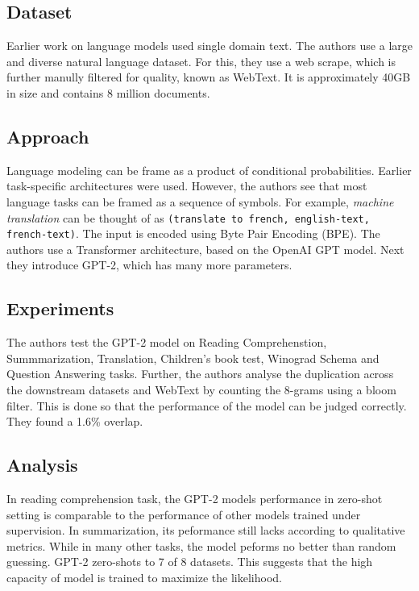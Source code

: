 \documentclass[12pt]{article}
\begin{document}
\subsection*{Dataset}

Earlier work on language models used single domain text. The authors use a large and diverse natural language dataset. For this, they use a web scrape, which is further manully filtered for quality, known as WebText. It is approximately 40GB in size and contains 8 million documents.

\subsection*{Approach}

Language modeling can be frame as a product of conditional probabilities. Earlier task-specific architectures were used. However, the authors see that most language tasks can be framed as a sequence of symbols. For example, \textit{machine translation} can be thought of as \texttt{(translate to french, english-text, french-text)}. The input is encoded using Byte Pair Encoding (BPE). The authors use a Transformer architecture, based on the OpenAI GPT model. Next they introduce GPT-2, which has many more parameters.

\subsection*{Experiments}

The authors test the GPT-2 model on Reading Comprehenstion, Summmarization, Translation, Children's book test, Winograd Schema and Question Answering tasks. Further, the authors analyse the duplication across the downstream datasets and WebText by counting the 8-grams using a bloom filter. This is done so that the performance of the model can be judged correctly. They found a 1.6\% overlap.

\subsection*{Analysis}

In reading comprehension task, the GPT-2 models performance in zero-shot setting is comparable to the performance of other models trained under supervision. In summarization, its peformance still lacks according to qualitative metrics. While in many other tasks, the model peforms no better than random guessing. GPT-2 zero-shots to 7 of 8 datasets. This suggests that the high capacity of model is trained to maximize the likelihood.
\end{document}
